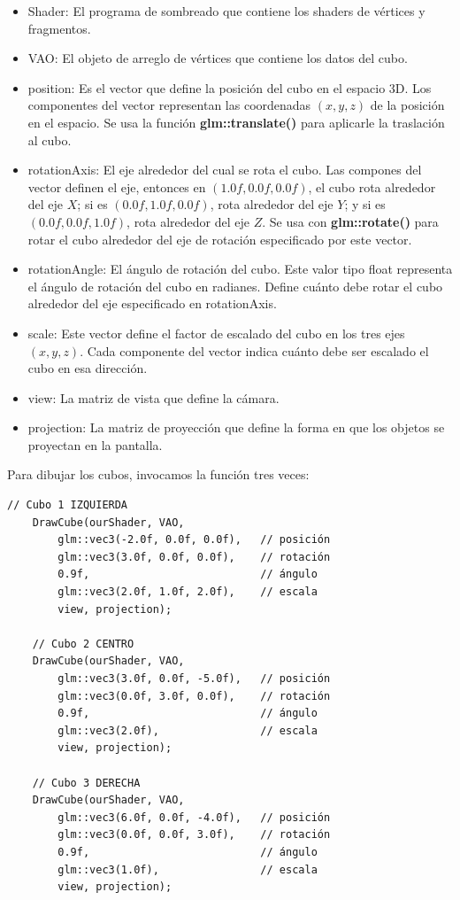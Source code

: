 \documentclass[a4paper,11pt]{article}                 %
\begin{document}
\begin{itemize}
    \item Shader: El programa de sombreado que contiene los shaders de vértices y fragmentos. 
    \item VAO: El objeto de arreglo de vértices que contiene los datos del cubo.
    \item position: Es el vector que define la posición del cubo en el espacio 3D. Los componentes del vector representan las coordenadas $(x,y,z)$ de la posición en el espacio. Se usa la función \textbf{glm::translate()} para aplicarle la traslación al cubo. 
    \item rotationAxis: El eje alrededor del cual se rota el cubo. Las compones del vector definen el eje, entonces en $(1.0f, 0.0f, 0.0f)$, el cubo rota alrededor del eje $X$; si es $(0.0f, 1.0f, 0.0f)$, rota alrededor del eje $Y$; y si es $(0.0f, 0.0f, 1.0f)$, rota alrededor del eje $Z$. Se usa con \textbf{glm::rotate()} para rotar el cubo alrededor del eje de rotación especificado por este vector.
    \item rotationAngle: El ángulo de rotación del cubo. Este valor tipo float representa el ángulo de rotación del cubo en radianes. Define cuánto debe rotar el cubo alrededor del eje especificado en rotationAxis.
    \item scale: Este vector define el factor de escalado del cubo en los tres ejes $(x, y, z)$. Cada componente del vector indica cuánto debe ser escalado el cubo en esa dirección.
    \item view: La matriz de vista que define la cámara.
    \item projection: La matriz de proyección que define la forma en que los objetos se proyectan en la pantalla.
\end{itemize}

Para dibujar los cubos, invocamos la función tres veces:
\begin{lstlisting}[style=cppstyle]
    // Cubo 1 IZQUIERDA
    DrawCube(ourShader, VAO,
        glm::vec3(-2.0f, 0.0f, 0.0f),   // posición
        glm::vec3(3.0f, 0.0f, 0.0f),    // rotación
        0.9f,                           // ángulo
        glm::vec3(2.0f, 1.0f, 2.0f),    // escala
        view, projection);

    // Cubo 2 CENTRO
    DrawCube(ourShader, VAO,
        glm::vec3(3.0f, 0.0f, -5.0f),   // posición
        glm::vec3(0.0f, 3.0f, 0.0f),    // rotación
        0.9f,                           // ángulo
        glm::vec3(2.0f),                // escala
        view, projection);

    // Cubo 3 DERECHA
    DrawCube(ourShader, VAO,
        glm::vec3(6.0f, 0.0f, -4.0f),   // posición
        glm::vec3(0.0f, 0.0f, 3.0f),    // rotación
        0.9f,                           // ángulo
        glm::vec3(1.0f),                // escala
        view, projection);
\end{lstlisting}
\end{document}
